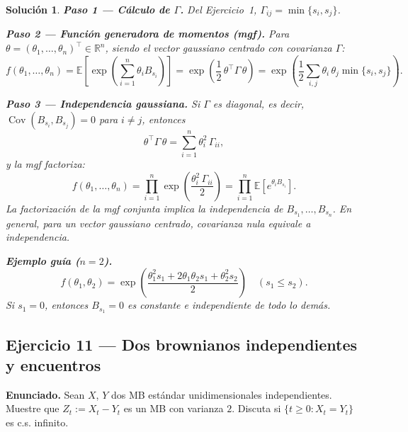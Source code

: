 \documentclass[12pt,letterpaper]{article}
\theoremstyle{ejercicio}
\theoremstyle{solucion}
\newtheorem*{solucion}{Solución}
\newcommand{\E}{\mathbb{E}}
\newcommand{\Cov}{\operatorname{Cov}}
\newcommand{\R}{\mathbb{R}}
\begin{document}
\begin{solucion}

\textbf{Paso 1 — Cálculo de $\Gamma$.}
Del Ejercicio~1, $\Gamma_{ij}=\min\{s_i,s_j\}$.

\textbf{Paso 2 — Función generadora de momentos (mgf).}
Para $\theta=(\theta_1,\dots,\theta_n)^\top\in\R^n$, siendo el vector gaussiano
centrado con covarianza $\Gamma$:
\[
  f(\theta_1,\dots,\theta_n)
  = \E\!\left[\exp\!\left(\sum_{i=1}^n\theta_i B_{s_i}\right)\right]
  = \exp\!\left(\frac{1}{2}\,\theta^\top\Gamma\,\theta\right)
  = \exp\!\left(\frac{1}{2}\sum_{i,j}\theta_i\,\theta_j\min\{s_i,s_j\}\right).
\]

\textbf{Paso 3 — Independencia gaussiana.}
Si $\Gamma$ es diagonal, es decir, $\Cov(B_{s_i},B_{s_j})=0$ para $i\ne j$, entonces
\[
  \theta^\top\Gamma\,\theta = \sum_{i=1}^n\theta_i^2\,\Gamma_{ii},
\]
y la mgf factoriza:
\[
  f(\theta_1,\dots,\theta_n) = \prod_{i=1}^n\exp\!\left(\frac{\theta_i^2\,\Gamma_{ii}}{2}\right)
  = \prod_{i=1}^n\E\!\left[e^{\theta_i B_{s_i}}\right].
\]
La factorización de la mgf conjunta implica la independencia de $B_{s_1},\dots,B_{s_n}$.
En general, para un vector gaussiano centrado, covarianza nula equivale a independencia.

\textbf{Ejemplo guía ($n=2$).}
\[
  f(\theta_1,\theta_2)
  = \exp\!\left(\frac{\theta_1^2 s_1 + 2\theta_1\theta_2 s_1 + \theta_2^2 s_2}{2}\right)
  \quad(s_1\le s_2).
\]
Si $s_1=0$, entonces $B_{s_1}=0$ es constante e independiente de todo lo demás.
\end{solucion}

\subsection*{Ejercicio 11 — Dos brownianos independientes y encuentros}

\begin{recuadro}
\textbf{Enunciado.} Sean $X$, $Y$ dos MB estándar unidimensionales independientes.
Muestre que $Z_t:=X_t-Y_t$ es un MB con varianza $2$. Discuta si
$\{t\ge 0:X_t=Y_t\}$ es c.s. infinito.
\end{recuadro}
\end{document}

